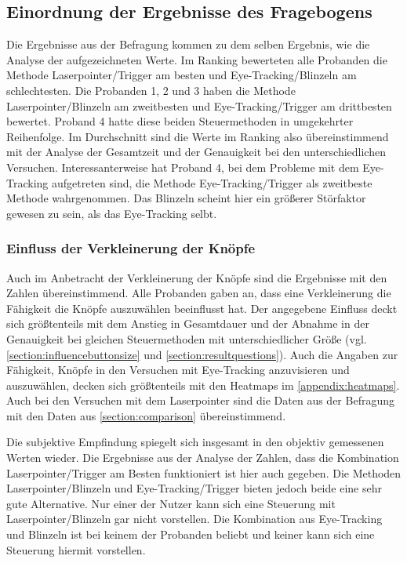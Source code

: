 \subsection{Einordnung der Ergebnisse des Fragebogens}
Die Ergebnisse aus der Befragung kommen zu dem selben Ergebnis, wie die Analyse der aufgezeichneten Werte. Im Ranking bewerteten alle Probanden die Methode Laserpointer/Trigger am besten und Eye-Tracking/Blinzeln am schlechtesten. Die Probanden 1, 2 und 3 haben die Methode Laserpointer/Blinzeln am zweitbesten und Eye-Tracking/Trigger am drittbesten bewertet. Proband 4 hatte diese beiden Steuermethoden in umgekehrter Reihenfolge. Im Durchschnitt sind die Werte im Ranking also übereinstimmend mit der Analyse der Gesamtzeit und der Genauigkeit bei den unterschiedlichen Versuchen. Interessanterweise hat Proband 4, bei dem Probleme mit dem Eye-Tracking aufgetreten sind, die Methode Eye-Tracking/Trigger als zweitbeste Methode wahrgenommen. Das Blinzeln scheint hier ein größerer Störfaktor gewesen zu sein, als das Eye-Tracking selbt. 

\subsubsection{Einfluss der Verkleinerung der Knöpfe}
Auch im Anbetracht der Verkleinerung der Knöpfe sind die Ergebnisse mit den Zahlen übereinstimmend. Alle Probanden gaben an, dass eine Verkleinerung die Fähigkeit die Knöpfe auszuwählen beeinflusst hat. Der angegebene Einfluss deckt sich größtenteils mit dem Anstieg in Gesamtdauer und der Abnahme in der Genauigkeit bei gleichen Steuermethoden mit unterschiedlicher Größe (vgl. \autoref{section:influencebuttonsize} und \autoref{section:resultquestions}). Auch die Angaben zur Fähigkeit, Knöpfe in den Versuchen mit Eye-Tracking anzuvisieren und auszuwählen, decken sich größtenteils mit den Heatmaps im \autoref{appendix:heatmaps}. Auch bei den Versuchen mit dem Laserpointer sind die Daten aus der Befragung mit den Daten aus \autoref{section:comparison} übereinstimmend. 

Die subjektive Empfindung spiegelt sich insgesamt in den objektiv gemessenen Werten wieder. Die Ergebnisse aus der Analyse der Zahlen, dass die Kombination Laserpointer/Trigger am Besten funktioniert ist hier auch gegeben. Die Methoden Laserpointer/Blinzeln und Eye-Tracking/Trigger bieten jedoch beide eine sehr gute Alternative. Nur einer der Nutzer kann sich eine Steuerung mit Laserpointer/Blinzeln gar nicht vorstellen. Die Kombination aus Eye-Tracking und Blinzeln ist bei keinem der Probanden beliebt und keiner kann sich eine Steuerung hiermit vorstellen.

